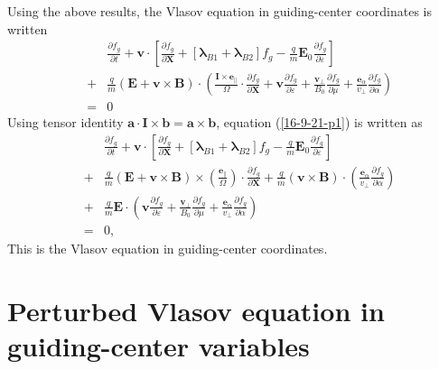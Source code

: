 \documentclass{article}
\newcommand{\tmmathbf}[1]{\ensuremath{\boldsymbol{#1}}}
\begin{document}
Using the above results, the Vlasov equation in guiding-center coordinates is
written
\begin{eqnarray}
  &  & \frac{\partial f_g}{\partial t} +\mathbf{v} \cdot \left[
  \frac{\partial f_g}{\partial \mathbf{X}} + [\tmmathbf{\lambda}_{B 1}
  +\tmmathbf{\lambda}_{B 2}] f_g - \frac{q}{m} \mathbf{E}_0 \frac{\partial
  f_g}{\partial \varepsilon} \right] \nonumber\\
  & + & \frac{q}{m} (\mathbf{E}+\mathbf{v} \times \mathbf{B}) \cdot \left(
  \frac{\mathbf{I} \times \tmmathbf{e}_{\parallel}}{\Omega} \cdot
  \frac{\partial f_g}{\partial \mathbf{X}} +\mathbf{v} \frac{\partial
  f_g}{\partial \varepsilon} + \frac{\mathbf{v}_{\perp}}{B_0}  \frac{\partial
  f_g}{\partial \mu} + \frac{\tmmathbf{e}_{\alpha}}{v_{\perp}}  \frac{\partial
  f_g}{\partial \alpha} \right) \nonumber\\
  & = & 0  \label{16-9-21-p1}
\end{eqnarray}
Using tensor identity $\mathbf{a} \cdot \mathbf{I} \times
\mathbf{b}=\mathbf{a} \times \mathbf{b}$, equation (\ref{16-9-21-p1}) is
written as
\begin{eqnarray}
  &  & \frac{\partial f_g}{\partial t} +\mathbf{v} \cdot \left[
  \frac{\partial f_g}{\partial \mathbf{X}} + [\tmmathbf{\lambda}_{B 1}
  +\tmmathbf{\lambda}_{B 2}] f_g - \frac{q}{m} \mathbf{E}_0 \frac{\partial
  f_g}{\partial \varepsilon} \right] \nonumber\\
  & + & \frac{q}{m} (\mathbf{E}+\mathbf{v} \times \mathbf{B}) \times \left(
  \frac{\tmmathbf{e}_{\parallel}}{\Omega}  \right) \cdot \frac{\partial
  f_g}{\partial \mathbf{X}} + \frac{q}{m} (\mathbf{v} \times \mathbf{B}) \cdot
  \left( \frac{\tmmathbf{e}_{\alpha}}{v_{\perp}}  \frac{\partial f_g}{\partial
  \alpha} \right) \nonumber\\
  & + & \frac{q}{m} \mathbf{E} \cdot \left( \mathbf{v} \frac{\partial
  f_g}{\partial \varepsilon} + \frac{\mathbf{v}_{\perp}}{B_0}  \frac{\partial
  f_g}{\partial \mu} + \frac{\tmmathbf{e}_{\alpha}}{v_{\perp}}  \frac{\partial
  f_g}{\partial \alpha} \right) \nonumber\\
  & = & 0,  \label{16-10-2-p1}
\end{eqnarray}
This is the Vlasov equation in guiding-center coordinates.

\section{Perturbed Vlasov equation in guiding-center variables}
\end{document}
